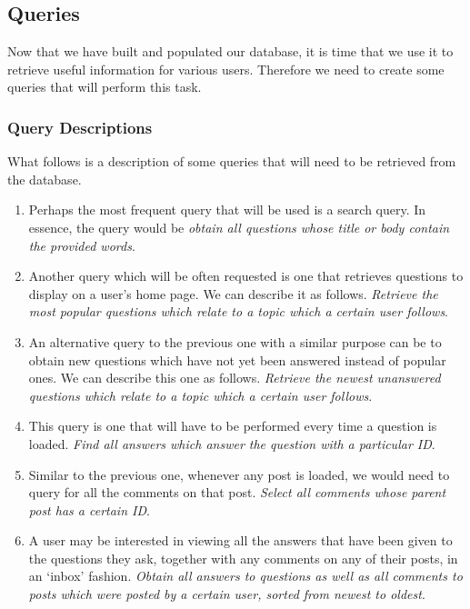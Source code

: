 \subsection{Queries}

Now that we have built and populated our database, it is time that we use it to retrieve useful information for various users. Therefore we need to create some queries that will perform this task.

\subsubsection{Query Descriptions}

What follows is a description of some queries that will need to be retrieved from the database.

\begin{enumerate}
	\item
	Perhaps the most frequent query that will be used is a search query. In essence, the query would be \emph{obtain all questions whose title or body contain the provided words}.

	\item
	Another query which will be often requested is one that retrieves questions to display on a user's home page. We can describe it as follows. \emph{Retrieve the most popular questions which relate to a topic which a certain user follows}.

	\item
	An alternative query to the previous one with a similar purpose can be to obtain new questions which have not yet been answered instead of popular ones. We can describe this one as follows. \emph{Retrieve the newest unanswered questions which relate to a topic which a certain user follows}.

	\item
	This query is one that will have to be performed every time a question is loaded. \emph{Find all answers which answer the question with a particular ID}.

	\item
	Similar to the previous one, whenever any post is loaded, we would need to query for all the comments on that post. \emph{Select all comments whose parent post has a certain ID}.

	\item
	A user may be interested in viewing all the answers that have been given to the questions they ask, together with any comments on any of their posts, in an `inbox' fashion. \emph{Obtain all answers to questions as well as all comments to posts which were posted by a certain user, sorted from newest to oldest}.


\end{enumerate}
